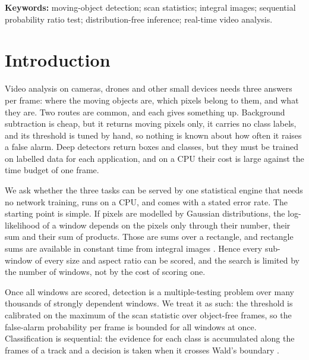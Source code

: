\documentclass[11pt,a4paper]{article}
\theoremstyle{definition}
\begin{document}
\noindent\textbf{Keywords:} moving-object detection; scan statistics; integral images; sequential probability ratio test; distribution-free inference; real-time video analysis.

\section{Introduction}\label{sec:intro}
Video analysis on cameras, drones and other small devices needs three answers per frame: where the moving objects are, which pixels belong to them, and what they are.
Two routes are common, and each gives something up.
Background subtraction is cheap, but it returns moving pixels only, it carries no class labels, and its threshold is tuned by hand, so nothing is known about how often it raises a false alarm.
Deep detectors return boxes and classes, but they must be trained on labelled data for each application, and on a CPU their cost is large against the time budget of one frame.

We ask whether the three tasks can be served by one statistical engine that needs no network training, runs on a CPU, and comes with a stated error rate.
The starting point is simple.
If pixels are modelled by Gaussian distributions, the log-likelihood of a window depends on the pixels only through their number, their sum and their sum of products.
Those are sums over a rectangle, and rectangle sums are available in constant time from integral images \cite{crow1984,viola2004}.
Hence every sub-window of every size and aspect ratio can be scored, and the search is limited by the number of windows, not by the cost of scoring one.

Once all windows are scored, detection is a multiple-testing problem over many thousands of strongly dependent windows.
We treat it as such: the threshold is calibrated on the maximum of the scan statistic over object-free frames, so the false-alarm probability per frame is bounded for all windows at once.
Classification is sequential: the evidence for each class is accumulated along the frames of a track and a decision is taken when it crosses Wald's boundary \cite{wald1945}.
\end{document}
